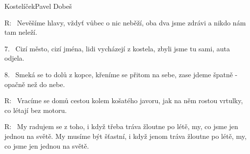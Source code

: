 \begin{song}{Kostelíček}{Pavel Dobeš}
\begin{xverse}{R:~}
Nevěšíme hlavy, vždyť vůbec o nic neběží,
oba dva jsme zdrávi a nikdo nám tam neleží.
\end{xverse}

\begin{xverse}{7.~}
Cizí město, cizí jména, lidi vycházejí z kostela,
zbyli jsme tu sami, auta odjela.
\end{xverse}

\begin{xverse}{8.~}
Smeká se to dolů z kopce, křeníme se přitom na sebe,
zase jdeme špatně - opačně než do nebe.
\end{xverse}

\begin{xverse}{R:~}
Vracíme se domů cestou kolem košatého javoru,
jak na něm rostou vrtulky, co létají bez motoru.
\end{xverse}

\begin{xverse}{R:~}
My radujem se z toho, i když třeba tráva žloutne po létě,
my, co jsme jen jednou na světě.
My musíme být šťastní, i když jenom tráva žloutne po létě,
my, co jsme jen jednou na světě.
\end{xverse}

\end{song}



